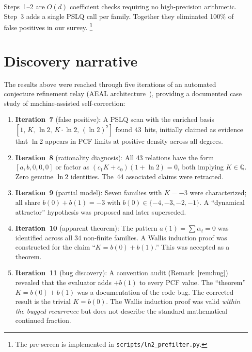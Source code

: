 \documentclass[11pt]{amsart}
\theoremstyle{definition}
\theoremstyle{remark}
\begin{document}
Steps~1--2 are $O(d)$ coefficient checks requiring no high-precision
arithmetic.
Step~3 adds a single PSLQ call per family.
Together they eliminated 100\% of false positives in our survey.%
\footnote{The pre-screen is implemented in
  \texttt{scripts/ln2\_prefilter.py}.}

\section{Discovery narrative}\label{sec:discovery}

The results above were reached through five iterations of an automated
conjecture refinement relay (AEAL architecture~\cite{aeal-paper7,aeal-paper8}),
providing a documented case study of machine-assisted self-correction:

\begin{enumerate}
  \item \textbf{Iteration~7} (false positive):
    A PSLQ scan with the enriched basis
    $[1,\, K,\, \ln 2,\, K\!\cdot\!\ln 2,\, (\ln 2)^2]$
    found 43~hits, initially claimed as evidence that $\ln 2$
    appears in PCF limits at positive density across all degrees.

  \item \textbf{Iteration~8} (rationality diagnosis):
    All 43 relations have the form $[a, b, 0, 0, 0]$
    or factor as $(c_1 K + c_0)(1{+}\ln 2) = 0$,
    both implying $K\in\mathbb{Q}$.
    Zero genuine $\ln 2$ identities.
    The~44 associated claims were retracted.

  \item \textbf{Iteration~9} (partial model):
    Seven families with $K{=}{-}3$ were characterized;
    all share $b(0)+b(1)=-3$ with
    $b(0) \in \{-4,-3,-2,-1\}$.
    A ``dynamical attractor'' hypothesis was proposed
    and later superseded.

  \item \textbf{Iteration~10} (apparent theorem):
    The pattern $a(1) = \sum\alpha_i = 0$ was identified across all
    34 non-finite families.  A Wallis induction proof was constructed
    for the claim ``$K = b(0)+b(1)$.''  This was accepted as a theorem.

  \item \textbf{Iteration~11} (bug discovery):
    A convention audit (Remark~\ref{rem:bug}) revealed that the
    evaluator adds $+b(1)$ to every PCF value.  The ``theorem''
    $K=b(0)+b(1)$ was a documentation of the code bug.
    The corrected result is the trivial $K=b(0)$.
    The Wallis induction proof was valid \emph{within the bugged
    recurrence} but does not describe the standard mathematical
    continued fraction.
\end{enumerate}
\end{document}
